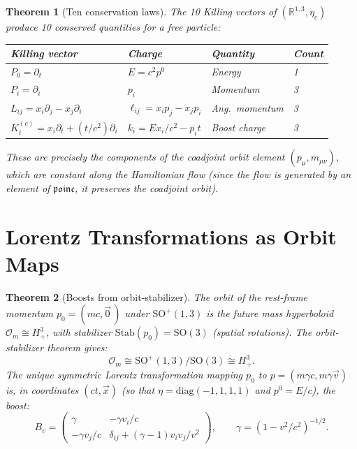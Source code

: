 \documentclass[12pt]{article}
\theoremstyle{plain}
\newtheorem{theorem}{Theorem}[section]
\theoremstyle{definition}
\theoremstyle{remark}
\newcommand{\R}{\mathbb{R}}
\newcommand{\Stab}{\mathrm{Stab}}
\newcommand{\SO}{\mathrm{SO}}
\begin{document}
\begin{theorem}[Ten conservation laws]\label{thm:ten-laws}
The 10 Killing vectors of $(\R^{1,3}, \eta_c)$ produce 10 conserved quantities for a free particle:
\begin{center}\small
\begin{tabular}{llll}\toprule
\textbf{Killing vector} & \textbf{Charge} & \textbf{Quantity} & \textbf{Count}\\\midrule
$P_0 = \partial_t$ & $E = c^2 p^0$ & Energy & 1\\
$P_i = \partial_i$ & $p_i$ & Momentum & 3\\
$L_{ij} = x_i\partial_j - x_j\partial_i$ & $\ell_{ij} = x_ip_j - x_jp_i$ & Ang.\ momentum & 3\\
$K_i^{(c)} = x_i\partial_t + (t/c^2)\partial_i$ & $k_i = Ex_i/c^2 - p_it$ & Boost charge & 3\\\bottomrule
\end{tabular}
\end{center}
These are precisely the components of the coadjoint orbit element $(p_\mu, m_{\mu\nu})$, which are constant along the Hamiltonian flow (since the flow is generated by an element of $\mathfrak{poinc}$, it preserves the coadjoint orbit).
\end{theorem}


\section{Lorentz Transformations as Orbit Maps}
\label{sec:lorentz}

\begin{theorem}[Boosts from orbit-stabilizer]\label{thm:boosts}
The orbit of the rest-frame momentum $p_0 = (mc, \vec{0}\,)$ under $\SO^+(1,3)$ is the future mass hyperboloid $\mathcal{O}_m \cong H^3_+$, with stabilizer $\Stab(p_0) = \SO(3)$ (spatial rotations). The orbit-stabilizer theorem gives:
\begin{equation}
\mathcal{O}_m \cong \SO^+(1,3)/\SO(3) \cong H^3_+.
\end{equation}
The unique symmetric Lorentz transformation mapping $p_0$ to $p = (m\gamma c, m\gamma\vec{v})$ is, in coordinates $(ct,\vec x)$ (so that $\eta = \mathrm{diag}(-1,1,1,1)$ and $p^0 = E/c$), the boost:
\begin{equation}\label{eq:boost}
B_v = \begin{pmatrix} \gamma & -\gamma v_i/c \\ -\gamma v_j/c & \delta_{ij} + (\gamma-1)v_iv_j/v^2 \end{pmatrix}, \qquad \gamma = (1 - v^2/c^2)^{-1/2}.
\end{equation}
\end{theorem}
\end{document}
